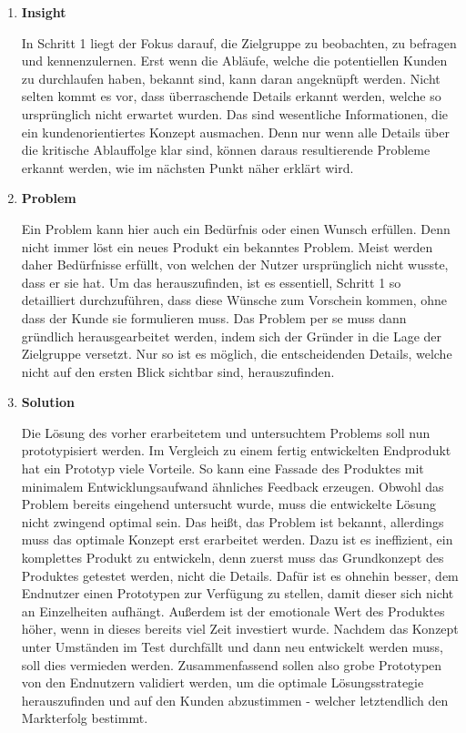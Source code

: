 \begin{enumerate}
	\item \textbf{Insight}
	
	In Schritt 1 liegt der Fokus darauf, die Zielgruppe zu beobachten, zu befragen und kennenzulernen. Erst wenn die Abläufe, welche die potentiellen Kunden zu durchlaufen haben, bekannt sind, kann daran angeknüpft werden. Nicht selten kommt es vor, dass überraschende Details erkannt werden, welche so ursprünglich nicht erwartet wurden. Das sind wesentliche Informationen, die ein kundenorientiertes Konzept ausmachen. Denn nur wenn alle Details über die kritische Ablauffolge klar sind, können daraus resultierende Probleme erkannt werden, wie im nächsten Punkt näher erklärt wird. 
	
	\item \textbf{Problem}
	
	Ein Problem kann hier auch ein Bedürfnis oder einen Wunsch erfüllen. Denn nicht immer löst ein neues Produkt ein bekanntes Problem. Meist werden daher Bedürfnisse erfüllt, von welchen der Nutzer ursprünglich nicht wusste, dass er sie hat. Um das herauszufinden, ist es essentiell, Schritt 1 so detailliert durchzuführen, dass diese Wünsche zum Vorschein kommen, ohne dass der Kunde sie formulieren muss. Das Problem per se muss dann gründlich herausgearbeitet werden, indem sich der Gründer in die Lage der Zielgruppe versetzt. Nur so ist es möglich, die entscheidenden Details, welche nicht auf den ersten Blick sichtbar sind, herauszufinden.
	
	\item \textbf{Solution}
	
	Die Lösung des vorher erarbeitetem und untersuchtem Problems soll nun prototypisiert werden. Im Vergleich zu einem fertig entwickelten Endprodukt hat ein Prototyp viele Vorteile. So kann eine Fassade des Produktes mit minimalem Entwicklungsaufwand ähnliches Feedback erzeugen. Obwohl das Problem bereits eingehend untersucht wurde, muss die entwickelte Lösung nicht zwingend optimal sein. Das heißt, das Problem ist bekannt, allerdings muss das optimale Konzept erst erarbeitet werden. Dazu ist es ineffizient, ein komplettes Produkt zu entwickeln, denn zuerst muss das Grundkonzept des Produktes getestet werden, nicht die Details. Dafür ist es ohnehin besser, dem Endnutzer einen Prototypen zur Verfügung zu stellen, damit dieser sich nicht an Einzelheiten aufhängt. Außerdem ist der emotionale Wert des Produktes höher, wenn in dieses bereits viel Zeit investiert wurde. Nachdem das Konzept unter Umständen im Test durchfällt und dann neu entwickelt werden muss, soll dies vermieden werden. Zusammenfassend sollen also grobe Prototypen von den Endnutzern validiert werden, um die optimale Lösungsstrategie herauszufinden und auf den Kunden abzustimmen - welcher letztendlich den Markterfolg bestimmt.
	

\end{enumerate}

